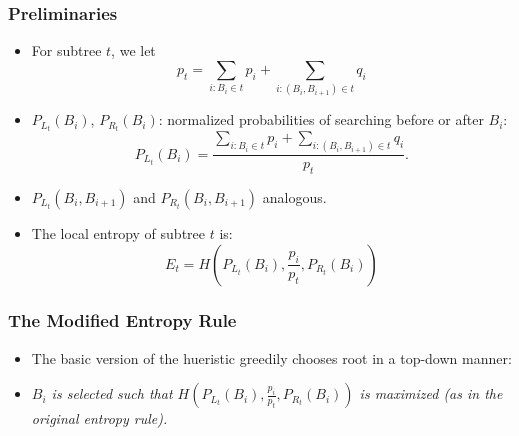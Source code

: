 \documentclass[]{beamer}
\theoremstyle{plain}
\begin{document}
\begin{frame} \frametitle{Preliminaries}

\begin{itemize}

\item For subtree $t$, we let 
\begin{equation}
p_t=\sum_{i : B_i \in t} p_i + \sum_{i : (B_i, B_{i+1}) \in t} q_i
\end{equation}
\item $P_{L_t}(B_i)$, $P_{R_t}(B_i)$: normalized probabilities of searching before or after $B_i$:
\begin{equation}
P_{L_t}(B_i) = \frac{\sum_{i : B_i \in t} p_i + \sum_{i : (B_i, B_{i+1}) \in t} q_i}{p_t}.
\end{equation}
\item $P_{L_t}(B_i,B_{i+1})$ and $P_{R_t}(B_i,B_{i+1})$ analogous. \\
\item The local entropy of subtree $t$ is:
\begin{equation}
E_t=H(P_{L_t}(B_i), \frac{p_i}{p_t}, P_{R_t}(B_i))
\end{equation} 

\end{itemize}
\end{frame}


\begin{frame} \frametitle{The Modified Entropy Rule}\label{The Entropy Rule}

\begin{itemize}
\item The basic version of the hueristic greedily chooses root in a top-down manner:
\item \begin{center}
\textit{$B_i$ is selected such that $H(P_{L_t}(B_i), \frac{p_i}{p_t}, P_{R_t}(B_i))$ is maximized (as in the original entropy rule).}
\end{center}
\end{itemize}

\end{frame}
\end{document}
